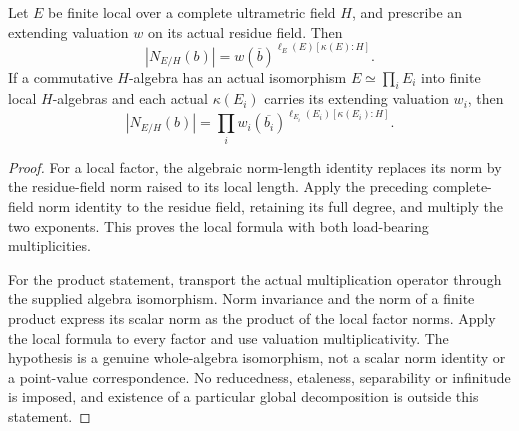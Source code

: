 \begin{theorem}
\label{spectrum:nonetale-local-valued-norm}
\leanok
{}
Let $E$ be finite local over a complete ultrametric field $H$, and prescribe
an extending valuation $w$ on its actual residue field. Then
\[
 |N_{E/H}(b)|=w(\overline b)^{\ell_E(E)[\kappa(E):H]}.
\]
If a commutative $H$-algebra has an actual isomorphism
$E\simeq\prod_i E_i$ into finite local $H$-algebras and each actual
$\kappa(E_i)$ carries its extending valuation $w_i$, then
\[
 |N_{E/H}(b)|=\prod_i
 w_i(\overline{b_i})^{\ell_{E_i}(E_i)[\kappa(E_i):H]}.
\]
\end{theorem}
\begin{proof}
For a local factor, the algebraic norm-length identity replaces its
norm by the residue-field norm raised to its local length. Apply the
preceding complete-field norm identity to the residue field, retaining
its full degree, and multiply the two exponents. This proves the local
formula with both load-bearing multiplicities.

For the product statement, transport the actual multiplication operator
through the supplied algebra isomorphism. Norm invariance and the norm of
a finite product express its scalar norm as the product of the local
factor norms. Apply the local formula to every factor and use valuation
multiplicativity. The hypothesis is a genuine whole-algebra isomorphism,
not a scalar norm identity or a point-value correspondence. No reducedness,
etaleness, separability or infinitude is imposed, and existence of a
particular global decomposition is outside this statement.
\end{proof}

